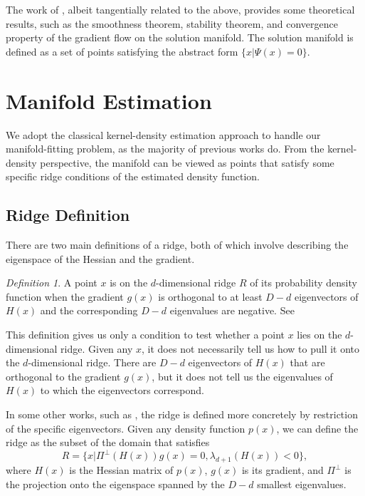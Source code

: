 \documentclass[aos,preprint]{imsart}
\theoremstyle{remark}
\newtheorem{definition}[theorem]{Definition}
\begin{document}
The work of \cite{chen2020solution}, albeit tangentially related to the above, provides some theoretical results, such as the smoothness theorem, stability theorem, and convergence property of the gradient flow on the solution manifold. The solution manifold is defined as a set of points satisfying the abstract form $\{x| \Psi(x) = 0\}$.


\section{Manifold Estimation}

We adopt the classical kernel-density estimation approach to handle our manifold-fitting problem, as the majority of previous works do. From the kernel-density perspective, the manifold can be viewed as points that satisfy some specific ridge conditions of the estimated density function.
\subsection{Ridge Definition}
There are two main definitions of a ridge, both of which involve describing the eigenspace of the Hessian and the gradient.
\begin{definition}\label{RR}
A point $x$ is on the $d$-dimensional ridge $R$ of its probability density function when the gradient $g(x)$ is orthogonal to at least $D-d$ eigenvectors of $H(x)$ and the corresponding $D-d$ eigenvalues are negative. See \cite{ozertem2011locally}
\end{definition}
This definition gives us only a condition to test whether a point $x$ lies on the $d$-dimensional ridge. Given any $x$, it does not necessarily tell us how to pull it onto the $d$-dimensional ridge. There are $D-d$ eigenvectors of $H(x)$ that are orthogonal to the gradient $g(x)$, but it does not tell us the eigenvalues of $H(x)$ to which the eigenvectors correspond.

In some other works, such as \cite{genovese2014nonparametric}, the ridge is defined more concretely by restriction of the specific eigenvectors. Given any density function $p(x)$, we can define the ridge as the subset of the domain that satisfies
\begin{equation}\label{ridgeDF}
R = \{x| \Pi^{\perp}(H(x)) g(x) = 0, \lambda_{d+1}(H(x))<0\},
\end{equation}
where $H(x)$ is the Hessian matrix of $p(x)$, $g(x)$ is its gradient, and $\Pi^{\perp}$ is the projection onto the eigenspace spanned by the $D-d$ smallest eigenvalues.
\end{document}
